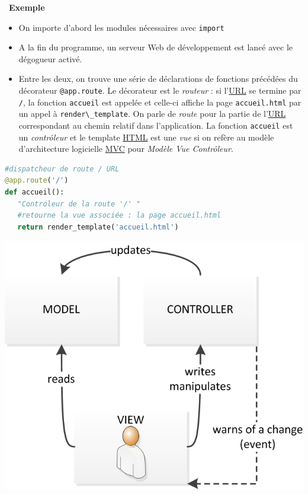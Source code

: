\documentclass[
  11pt,
]{article}
\newcommand{\passthrough}[1]{#1}
\providecommand{\tightlist}{%
  \setlength{\itemsep}{0pt}\setlength{\parskip}{0pt}}
\newcounter{def}
\newcounter{exple}
\newenvironment{exemple}[1]
{\par \medskip   \addtocounter{exple}{1} \noindent  
\begin{bclogo}[arrondi =0.1,   noborder = true, logo=\bclampe, marge=4]{~\textbf{Exemple} \textbf{\theexple} {\itshape #1} }  \par}
{
\end{bclogo}
 \par \bigskip }
\newcounter{prog}
\newcounter{logi}
\begin{document}
\begin{exemple}{}
\begin{enumerate}
\begin{itemize}
    \begin{itemize}
    \tightlist
    \item
      On importe d'abord les modules nécessaires avec
      \passthrough{\lstinline!import!}
    \item
      A la fin du programme, un serveur Web de développement est lancé
      avec le dégogueur activé.
    \item
      Entre les deux, on trouve une série de déclarations de fonctions
      précédées du décorateur \passthrough{\lstinline!@app.route!}. Le
      décorateur est le \emph{routeur} : si
      l'\href{https://developer.mozilla.org/fr/docs/Glossaire/URL}{URL}
      se termine par \passthrough{\lstinline!/!}, la fonction
      \passthrough{\lstinline!accueil!} est appelée et celle-ci affiche
      la page \passthrough{\lstinline!accueil.html!} par un appel à
      \passthrough{\lstinline!render\_template!}. On parle de
      \emph{route} pour la partie de
      l'\href{https://developer.mozilla.org/fr/docs/Glossaire/URL}{URL}
      correspondant au chemin relatif dans l'application. La fonction
      \passthrough{\lstinline!accueil!} est un \emph{contrôleur} et le
      template
      \href{https://developer.mozilla.org/fr/docs/Glossaire/HTML}{HTML}
      est une \emph{vue} si on refère au modèle d'architecture
      logicielle
      \href{https://developer.mozilla.org/fr/docs/Glossaire/MVC}{MVC}
      pour \emph{Modèle Vue Contrôleur}.
    \end{itemize}

\begin{lstlisting}[language=Python]
#dispatcheur de route / URL
@app.route('/')
def accueil():
   "Controleur de la route '/' "
   #retourne la vue associée : la page accueil.html
   return render_template('accueil.html')
\end{lstlisting}

    \includegraphics{images/ModeleMVC.png}\\


\end{itemize}
\end{enumerate}
\end{exemple}
\end{document}
